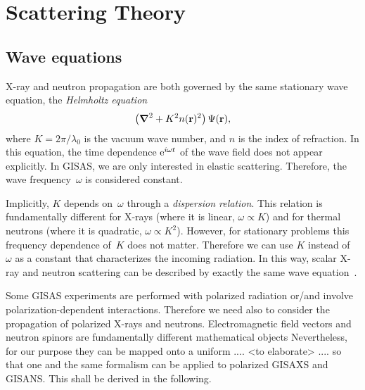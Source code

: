 

\chapter{Scattering Theory}  


\section{Wave equations}

X-ray and neutron propagation are both governed by
the same stationary wave equation,
the \textit{Helmholtz equation}
\begin{equation}\label{eq:Helmholtz}
  \left(\text{\boldmath$\nabla$}^2+K^2n(\mathbf{r})^2\right)\Psi(\mathbf{r}),
\end{equation}
where $K=2\pi/\lambda_0$ is the vacuum wave number,
and $n$ is the index of refraction.
In this equation,
the time dependence ${\rm e}^{i\omega t}$ of the wave field
does not appear explicitly.
In GISAS, we are only interested in elastic scattering.
Therefore, the wave frequency~$\omega$ is considered constant.

Implicitly, $K$ depends on~$\omega$ through a \textit{dispersion relation}.
This relation is fundamentally different for
X-rays (where it is linear, $\omega\propto K$)
and for thermal neutrons (where it is quadratic, $\omega\propto K^2$).
However, for stationary problems
this frequency dependence of~$K$ does not matter.
Therefore we can use $K$ instead of~$\omega$ as a constant
that characterizes the incoming radiation.
In this way, scalar X-ray and neutron scattering can be described by exactly
the same wave equation~.

Some GISAS experiments are performed with polarized radiation
or/and involve polarization-dependent interactions.
Therefore we need also to consider
the propagation of polarized X-rays and neutrons.
Electromagnetic field vectors and neutron spinors
are fundamentally different mathematical objects
Nevertheless, for our purpose they can be
mapped onto a uniform .... <to elaborate> ....
so that one and the same formalism can be applied
to polarized GISAXS and GISANS.
This shall be derived in the following.

